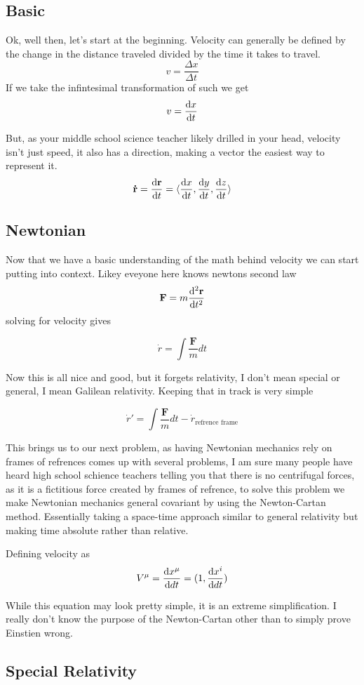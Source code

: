 \subsection{Basic}

Ok, well then, let's start at the beginning. Velocity can generally be defined by the change in the distance traveled divided by the time it takes to travel.
\[
	v= \frac{\Delta x}{\Delta t}
\]
If we take the infintesimal transformation of such we get
\[
	v = \dv{x}{t}
\]

But, as your middle school science teacher likely drilled in your head, velocity isn't just speed, it also has a direction, making a vector the easiest way to represent it.
\[
	\mathbf{\dot{r}} = \dv{\mathbf{r}}{t} = \langle \dv{x}{t}, \dv{y}{t}, \dv{z}{t} \rangle
\]

\subsection{Newtonian}

Now that we have a basic understanding of the math behind velocity we can start putting into context. Likey eveyone here knows newtons second law
\[
	\mathbf{F} = m \dv[2]{\mathbf{r}}{t}
\]
solving for velocity gives

\[
	\dot{r} = \int \frac{\mathbf{F}}{m} dt
\]

Now this is all nice and good, but it forgets relativity, I don't mean special or general, I mean Galilean relativity. Keeping that in track is very simple

\[
	\dot{r}' = \int \frac{\mathbf{F}}{m} dt - \dot{r}_{\text{refrence frame}}
\]

This brings us to our next problem, as having Newtonian mechanics rely on frames of refrences comes up with several problems, I am sure many people have heard high school schience teachers telling you that there is no centrifugal forces, as it is a fictitious force created by frames of refrence, to solve this problem we make Newtonian mechanics general covariant by using the Newton-Cartan method. Essentially taking a space-time approach similar to general relativity but making time absolute rather than relative.

Defining velocity as
\[
	V^\mu = \dv{x^\mu}{dt} = (1, \dv{x^i}{dt})
\]

While this equation may look pretty simple, it is an extreme simplification. I really don't know the purpose of the Newton-Cartan other than to simply prove Einstien wrong.
\subsection{Special Relativity}

